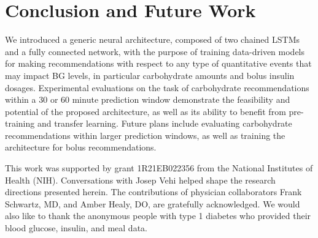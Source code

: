 \documentclass{ecai}
\begin{document}
\section{Conclusion and Future Work}

We introduced a generic neural architecture, composed of two chained LSTMs and a fully connected network, with the purpose of training data-driven models for making recommendations with respect to any type of quantitative events that may impact BG levels, in particular carbohydrate amounts and bolus insulin dosages. Experimental evaluations on the task of carbohydrate recommendations within a 30 or 60 minute prediction window demonstrate the feasibility and potential of the proposed architecture, as well as its ability to benefit from pre-training and transfer learning. Future plans include evaluating carbohydrate recommendations within larger prediction windows, as well as training the architecture for bolus recommendations.

\ack This work was supported by grant 1R21EB022356 from the National Institutes of Health (NIH).  Conversations with Josep Vehi helped shape the research directions presented herein.  The contributions of physician collaborators Frank Schwartz, MD, and Amber Healy, DO, are gratefully acknowledged.  We would also like to thank the anonymous people with type 1 diabetes who provided their blood glucose, insulin, and meal data.


\end{document}
